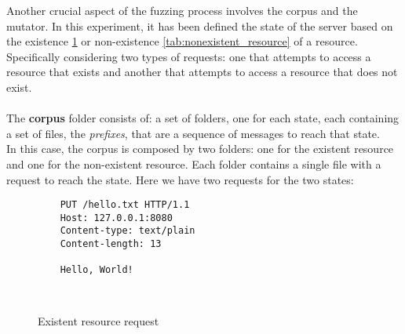 Another crucial aspect of the fuzzing process involves the corpus and the mutator. In this experiment, it has been defined the state of the server based on the existence \ref{tab:existent_resource} or non-existence \ref{tab:nonexistent_resource} of a resource. Specifically considering two types of requests: one that attempts to access a resource that exists and another that attempts to access a resource that does not exist.
\\\\The \textbf{corpus} folder consists of: a set of folders, one for each state, each containing a set of files, the \textit{prefixes}, that are a sequence of messages to reach that state.
\\In this case, the corpus is composed by two folders: one for the existent resource and one for the non-existent resource. Each folder contains a single file with a request to reach the state.
Here we have two requests for the two states:
\begin{figure}[H]
    \centering
    \begin{adjustbox}{valign=t}
    \begin{lstlisting}
    PUT /hello.txt HTTP/1.1
    Host: 127.0.0.1:8080
    Content-type: text/plain
    Content-length: 13

    Hello, World!

    
    \end{lstlisting}
    \end{adjustbox}
    \caption{Existent resource request}
    \label{tab:existent_resource}
\end{figure}
    
